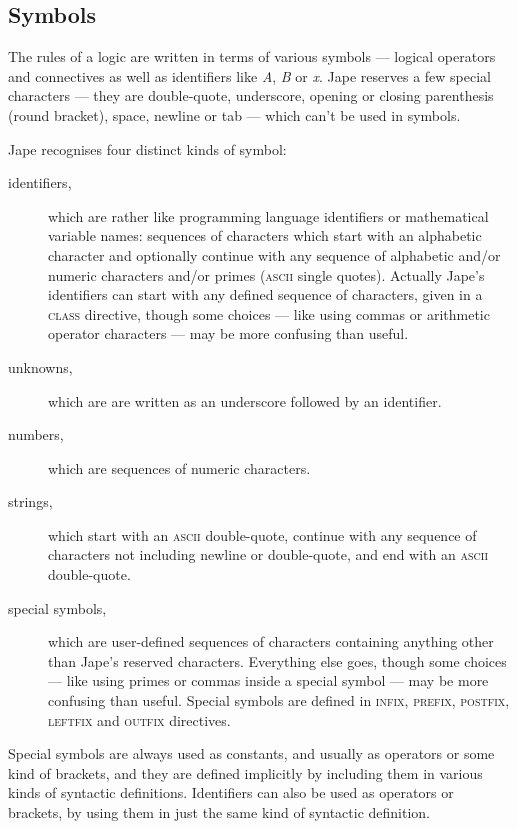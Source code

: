 \subsection{Symbols}

The rules of a logic are written in terms of various symbols --- logical operators and connectives as well as identifiers like \textit{A}, \textit{B} or \textit{x}. Jape reserves a few special characters --- they are double-quote, underscore, opening or closing parenthesis (round bracket), space, newline or tab --- which can't be used in symbols.

Jape recognises four distinct kinds of symbol:

\begin{description}
\item[identifiers,] which are rather like programming language identifiers or mathematical variable names: sequences of characters which start with an alphabetic character and optionally continue with any sequence of alphabetic and/or numeric characters and/or primes (\textsc{ascii} single quotes). Actually Jape's identifiers can start with any defined sequence of characters, given in a \textsc{class} directive, though some choices --- like using commas or arithmetic operator characters --- may be more confusing than useful.

\item[unknowns,] which are are written as an underscore followed by an identifier.

\item[numbers,] which are sequences of numeric characters.

\item[strings,] which start with an \textsc{ascii} double-quote, continue with any sequence of characters not including newline or double-quote, and end with an \textsc{ascii} double-quote.

\item[special symbols,] which are user-defined sequences of characters containing anything other than Jape's reserved characters. Everything else goes, though some choices --- like using primes or commas inside a special symbol --- may be more confusing than useful. Special symbols are defined in \textsc{infix, prefix, postfix, leftfix} and \textsc{outfix} directives.
\end{description}

Special symbols are always used as constants, and usually as operators or some kind of brackets, and they are defined implicitly by including them in various kinds of syntactic definitions. Identifiers can also be used as operators or brackets, by using them in just the same kind of syntactic definition.

